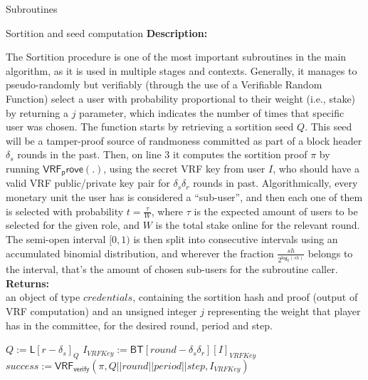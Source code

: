\documentclass[10pt,a4paper]{article}
\begin{document}
\begin{section}{Subroutines}
\begin{subsection}{Sortition and seed computation}
\noindent \textbf{Description:}

The Sortition procedure is one of the most important subroutines in the main algorithm, as it is 
used in multiple stages and contexts.
Generally, it manages to pseudo-randomly but verifiably (through the use of a Verifiable Random 
Function) select a user with probability proportional
to their weight (i.e., stake) by returning a $j$ parameter, which indicates the number of times that 
specific user was chosen.
The function starts by retrieving a sortition seed $Q$.
This seed will be a tamper-proof source of randmoness committed as part of a block header $\delta_s$ rounds in
the past.
Then, on line 3 it computes the sortition proof $\pi$ by running $\mathsf{VRF_prove}(.)$, 
using the secret VRF key from user $I$, who should have a valid VRF public/private key pair 
for $\delta_s\delta_r$ rounds in past.
Algorithmically, every monetary unit the user has is considered a ``sub-user'', and then each one 
of them is selected with probability $t = \frac{\tau}{W}$,
where $\tau$ is the expected amount of users to be selected for the given role, and $W$ is the total
stake online for the relevant round.
The semi-open interval $[0,1)$ is then split into consecutive intervals using an accumulated 
binomial distribution, and wherever the fraction $\frac{sh}{2^{\mathsf{log_2}(sh)}}$
belongs to the interval, that's the amount of chosen sub-users for the subroutine caller.\\

\noindent \textbf{Returns:}\\
    an object of type $credentials$, containing the sortition hash and proof (output of VRF
    computation) and an unsigned integer $j$ representing the weight that player has in the committee,
    for the desired round, period and step.



\begin{algorithm}[H]
    \begin{algorithmic}[1]
        \State $Q := \mathsf{L}[r - \delta_s]_{Q}$
        \State $I_{VRFKey} := \mathsf{BT}[round-\delta_s\delta_r][I]_{VRFKey}$
        \State $success := \mathsf{VRF_{verify}}(\pi, Q||round||period||step, I_{VRFKey})$
         \\


\end{algorithmic}
\end{algorithm}
\end{subsection}
\end{section}
\end{document}
